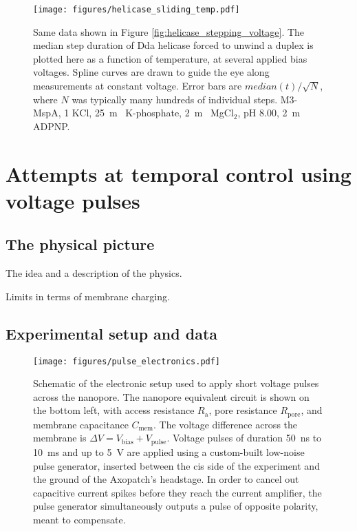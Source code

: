 \begin{figure}[h]
\begin{centering}
\texttt{[image: figures/helicase\_sliding\_temp.pdf]}
\caption[Forced helicase stepping depends on temperature]{Same data shown in Figure \ref{fig:helicase_stepping_voltage}.  The median step duration of Dda helicase forced to unwind a duplex is plotted here as a function of temperature, at several applied bias voltages.  Spline curves are drawn to guide the eye along measurements at constant voltage.  Error bars are $median(t)/\sqrt{N}$, where $N$ was typically many hundreds of individual steps.  M3-MspA, \SI{1}{\Molar} KCl, \SI{25}{\m\Molar} K-phosphate, \SI{2}{\m\Molar} MgCl$_2$, pH \num{8.00}, \SI{2}{\m\Molar} ADPNP.}
\label{fig:helicase_stepping_temp}
\end{centering}
\end{figure}


\section{Attempts at temporal control using voltage pulses}

\subsection{The physical picture}
The idea and a description of the physics.

Limits in terms of membrane charging.

\subsection{Experimental setup and data}

\begin{figure}[h]
\begin{centering}
\texttt{[image: figures/pulse\_electronics.pdf]}
\caption[Electronic setup for low-noise pulses across a nanopore]{Schematic of the electronic setup used to apply short voltage pulses across the nanopore.  The nanopore equivalent circuit is shown on the bottom left, with access resistance $R_{\text{a}}$, pore resistance $R_{\text{pore}}$, and membrane capacitance $C_{\text{mem}}$.  The voltage difference across the membrane is $\Delta V = V_{\text{bias}} + V_{\text{pulse}}$.  Voltage pulses of duration \SI{50}{\ns} to \SI{10}{\ms} and up to \SI{5}{\V} are applied using a custom-built low-noise pulse generator, inserted between the cis side of the experiment and the ground of the Axopatch's headstage.  In order to cancel out capacitive current spikes before they reach the current amplifier, the pulse generator simultaneously outputs a pulse of opposite polarity, meant to compensate.}
\label{fig:helicase_pulse_setup}
\end{centering}
\end{figure}

